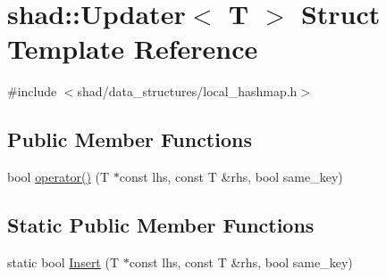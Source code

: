 \hypertarget{structshad_1_1Updater}{\section{shad\-:\-:Updater$<$ T $>$ Struct Template Reference}
\label{structshad_1_1Updater}
}


{\ttfamily \#include $<$shad/data\-\_\-structures/local\-\_\-hashmap.\-h$>$}

\subsection*{Public Member Functions}
\begin{DoxyCompactItemize}
\item 
bool \hyperlink{structshad_1_1Updater_a5edad1e56b0b35ed884e3d744e1e47e8}{operator()} (T $\ast$const lhs, const T \&rhs, bool same\-\_\-key)
\end{DoxyCompactItemize}
\subsection*{Static Public Member Functions}
\begin{DoxyCompactItemize}
\item 
static bool \hyperlink{structshad_1_1Updater_ae11f09a8191c7018a2115fe5a96f8b50}{Insert} (T $\ast$const lhs, const T \&rhs, bool same\-\_\-key)
\end{DoxyCompactItemize}


